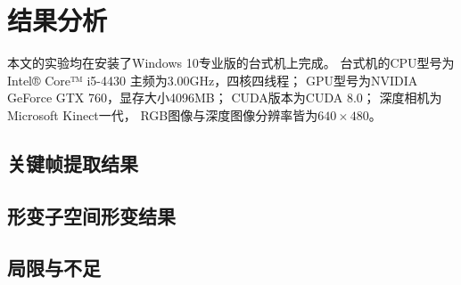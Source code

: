  \chapter{结果分析}
 本文的实验均在安装了Windows 10专业版的台式机上完成。
台式机的CPU型号为Intel® Core™ i5-4430 主频为3.00GHz，四核四线程；
GPU型号为NVIDIA GeForce GTX 760，显存大小4096MB；
CUDA版本为CUDA 8.0；
深度相机为Microsoft Kinect一代，
RGB图像与深度图像分辨率皆为$640 \times 480$。
 \section{关键帧提取结果}
 \section{形变子空间形变结果}
 \section{局限与不足}
